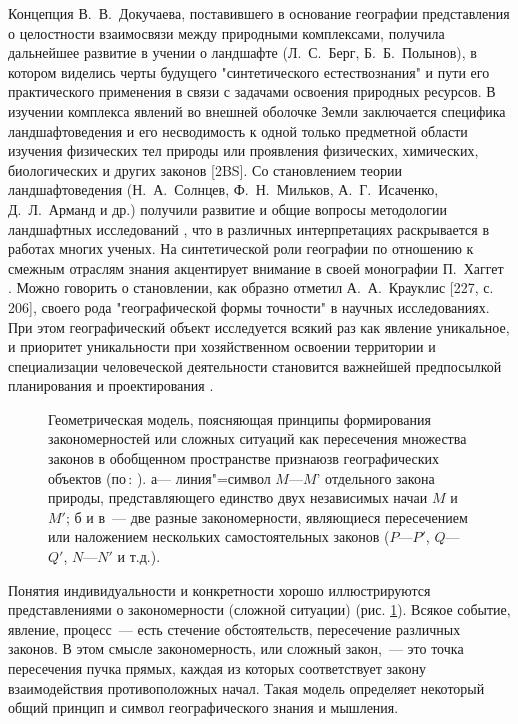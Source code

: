 \documentclass[draft,openany,14pt]{extbook}
\begin{document}
Концепция В.~В.~Докучаева, поставившего в основание географии представления о целостности взаимосвязи между природными комплексами, получила дальнейшее развитие в учении о ландшафте (Л.~С.~Берг, Б.~Б.~Полынов), в котором виделись черты будущего "синтетического естествознания" и пути его практического применения в связи с задачами освоения природных ресурсов. В изучении комплекса явлений во внешней оболочке Земли заключается специфика ландшафтоведения и его несводимость к одной только предметной области изучения физических тел природы или проявления физических, химических, биологических и других законов [2BS]. Со становлением теории ландшафтоведения (Н.~А.~Солнцев, Ф.~Н.~Мильков, А.~Г.~Исаченко, Д.~Л.~Арманд и др.) получили развитие и общие вопросы методологии ландшафтных исследований \cite{b288}, что в различных интерпретациях раскрывается в работах многих ученых. На синтетической роли географии по отношению к смежным отраслям знания акцентирует внимание в своей монографии П.~Хаггет \cite{b450}. Можно говорить о становлении, как образно отметил А.~А.~Крауклис [227, с. 206], своего рода "географической формы точности" в научных исследованиях. При этом географический объект исследуется всякий раз как явление уникальное, и приоритет уникальности при хозяйственном освоении территории и специализации человеческой деятельности становится важнейшей предпосылкой планирования и проектирования \cite{b351}.

\begin{figure}
\caption{Геометрическая модель, поясняющая принципы формирования закономерностей или сложных ситуаций как пересечения множества законов в обобщенном пространстве признаюзв географических объектов (по\,: \cite{b24}).  а--- линия"=символ $M$---$M$' отдельного закона природы, представляющего единство двух независимых начаи $M$ и $M'$; б и в~--- две разные закономерности, являющиеся пересечением или наложением нескольких самостоятельных законов ($P$---$P'$, $Q$---$Q'$, $N$---$N'$ и т.д.).}\label{pic:intro:1}
\end{figure}


Понятия индивидуальности и конкретности хорошо иллюстрируются представлениями о закономерности (сложной ситуации) (рис. \ref{pic:intro:1}). Всякое событие, явление, процесс~--- есть стечение обстоятельств, пересечение различных законов. В этом смысле закономерность, или сложный закон,~--- это точка пересечения пучка прямых, каждая из которых соответствует закону взаимодействия противоположных начал. Такая модель определяет некоторый общий принцип и символ географического знания и мышления.
\end{document}
